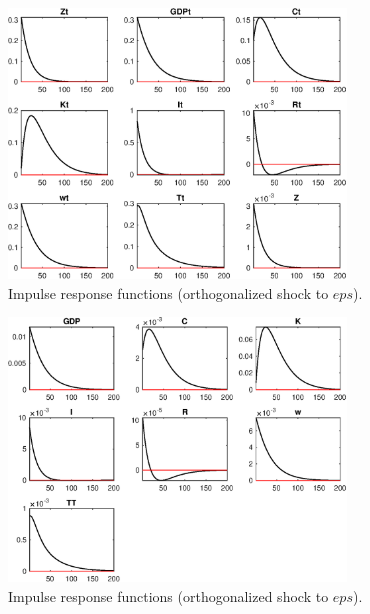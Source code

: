  
\begin{figure}[H]
\centering 
\includegraphics[width=0.80\textwidth]{DyTruncation/graphs/DyTruncation_IRF_eps1}
\caption{Impulse response functions (orthogonalized shock to $eps$).}\label{Fig:IRF:eps:1}
\end{figure}
 
\begin{figure}[H]
\centering 
\includegraphics[width=0.80\textwidth]{DyTruncation/graphs/DyTruncation_IRF_eps2}
\caption{Impulse response functions (orthogonalized shock to $eps$).}\label{Fig:IRF:eps:2}
\end{figure}
 
 
